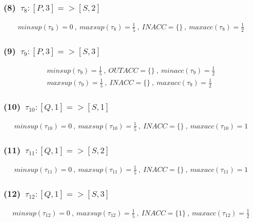 \documentclass[a4paper,12pt]{jarticle}
\begin{document}
\subsubsection*{(8)~$\tau_8:[P,3]=>[S,2]$}
\vspace{-4mm}
%
\begin{align*}
 minsup(\tau_8)=0~,~maxsup(\tau_8)=\frac{1}{5}~,~INACC=\{\}~,~maxacc(\tau_8)=\frac{1}{2}
\end{align*}
%
\vspace{-10mm}
\subsubsection*{(9)~$\tau_9:[P,3]=>[S,3]$}
\vspace{-4mm}
%
\begin{align*}
 minsup(\tau_9)=\frac{1}{5}~,~OUTACC=\{\}~,~minacc(\tau_9)=\frac{1}{2}\\
 maxsup(\tau_9)=\frac{1}{5}~,~INACC=\{\}~,~maxacc(\tau_9)=\frac{1}{2}
\end{align*}
%
\vspace{-10mm}
\subsubsection*{(10)~$\tau_{10}:[Q,1]=>[S,1]$}
\vspace{-4mm}
%
\begin{align*}
 minsup(\tau_{10})=0~,~maxsup(\tau_{10})=\frac{1}{5}~,~INACC=\{\}~,~maxacc(\tau_{10})=1
\end{align*}
%
\vspace{-10mm}
\subsubsection*{(11)~$\tau_{11}:[Q,1]=>[S,2]$}
\vspace{-4mm}
%
\begin{align*}
 minsup(\tau_{11})=0~,~maxsup(\tau_{11})=\frac{1}{5}~,~INACC=\{\}~,~maxacc(\tau_{11})=1
\end{align*}
%
\vspace{-10mm}
\subsubsection*{(12)~$\tau_{12}:[Q,1]=>[S,3]$}
\vspace{-4mm}
%
\begin{align*}
 minsup(\tau_{12})=0~,~maxsup(\tau_{12})=\frac{1}{5}~,~INACC=\{1\}~,~maxacc(\tau_{12})=\frac{1}{2}
\end{align*}
%
\vspace{-10mm}
\end{document}
